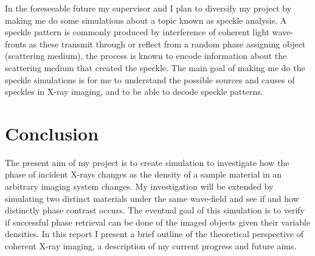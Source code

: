 \documentclass[9pt, a4paper]{article}
\begin{document}
In the foreseeable future my supervisor and I plan to diversify my project by making me do some simulations about a topic known as speckle analysis. A speckle pattern is commonly produced by interference of coherent light wave-fronts as these transmit through or reflect from a random phase assigning object (scattering medium), the process is known to encode information about the scattering medium that created the speckle\cite{Specks}. The main goal of making me do the speckle simulations is for me to understand the possible sources and causes of speckles in X-ray imaging, and to be able to decode speckle patterns.


\section{Conclusion}
The present aim of my project is to create simulation to investigate how the phase of incident X-rays changes as the density of a sample material in an arbitrary imaging system changes. My investigation will be extended by simulating two distinct materials under the same wave-field and see if and how distinctly phase contrast occurs. The eventual goal of this simulation is to verify if successful phase retrieval can be done of the imaged objects given their variable densities. In this report I present a brief outline of the theoretical perspective of coherent X-ray imaging, a description of my current progress and future aims.



\end{document}
